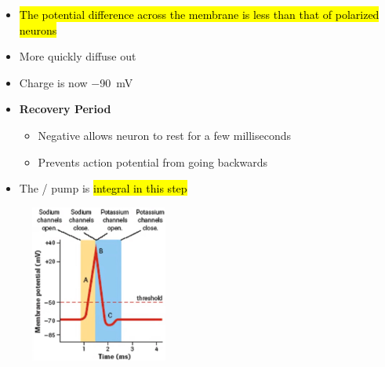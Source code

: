 \documentclass[a4paper,12pt]{article}
\begin{document}
\begin{enumerate}
{\begin{figure}[H]
            \end{figure}
            \begin{itemize}
                \item{\hl{The potential difference across the membrane is less than that of polarized neurons}}
                \item{More  quickly diffuse out}
                \item{Charge is now \SI{-90}{\mV}}
                \item{
                        \textbf{Recovery Period}
                        \begin{itemize}
                            \item{Negative allows neuron to rest for a few milliseconds}
                            \item{Prevents action potential from going backwards}
                        \end{itemize}
                    }
                \item{The  /  pump is \hl{integral in this step}}
            \end{itemize}
        }
\end{enumerate}
\begin{figure}[H]
    \centering
    \includegraphics[width=0.40\textwidth]{ngraph2}
\end{figure}
\end{document}
